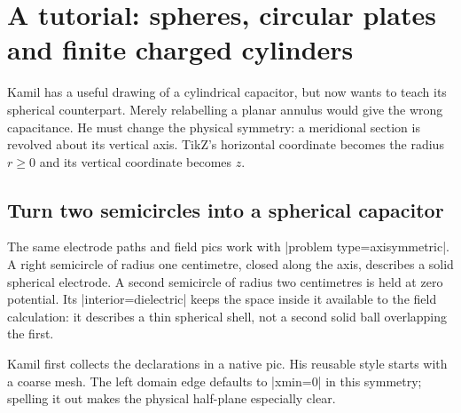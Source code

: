 \section{A tutorial: spheres, circular plates and finite charged cylinders}
\label{sec:tutorial-electric-axisymmetric}

Kamil has a useful drawing of a cylindrical capacitor, but now wants to teach
its spherical counterpart. Merely relabelling a planar annulus would give the
wrong capacitance. He must change the physical symmetry: a meridional section
is revolved about its vertical axis. TikZ's horizontal coordinate becomes the
radius $r\geq0$ and its vertical coordinate becomes $z$.

\subsection{Turn two semicircles into a spherical capacitor}
The same electrode paths and field pics work with |problem type=axisymmetric|.
A right semicircle of radius one centimetre, closed along the axis, describes
a solid spherical electrode. A second semicircle of radius two centimetres
is held at zero potential. Its |interior=dielectric| keeps the space inside
it available to the field calculation: it describes a thin spherical shell,
not a second solid ball overlapping the first.

Kamil first collects the declarations in a native pic. His reusable style
starts with a coarse mesh. The left domain edge defaults to |xmin=0| in this
symmetry; spelling it out makes the physical half-plane especially clear.

\begin{codeexample}
\end{codeexample}

